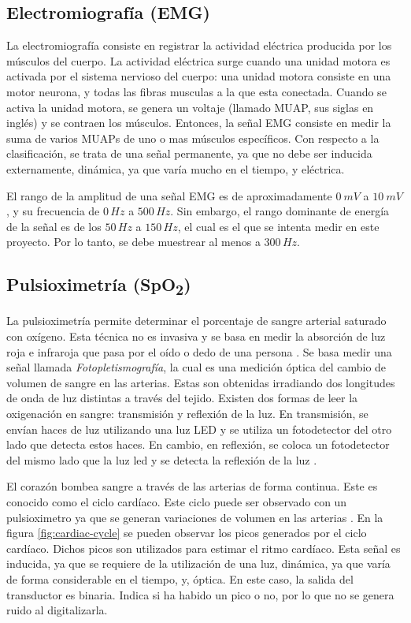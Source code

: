 \subsection{Electromiografía (EMG)}

La electromiografía consiste en registrar la actividad eléctrica producida por los músculos del cuerpo. La actividad eléctrica surge cuando una unidad motora es activada por el sistema nervioso del cuerpo: una unidad motora consiste en una motor neurona, y todas las fibras musculas a la que esta conectada.  Cuando se activa la unidad motora, se genera un voltaje (llamado MUAP, sus siglas en inglés) y se contraen los músculos.  Entonces, la señal EMG consiste en medir la suma de varios MUAPs de uno o mas músculos específicos. Con respecto a la clasificación, se trata de una señal permanente, ya que no debe ser inducida externamente, dinámica, ya que varía mucho en el tiempo, y eléctrica.

El rango de la amplitud de una señal EMG es de aproximadamente $0\ mV$ a $10\ mV$, y su frecuencia de $0\, Hz$ a $500\, Hz$.  Sin embargo, el rango dominante de energía de la señal es de los $50\, Hz$ a $150\, Hz$, el cual es el que se intenta medir en este proyecto. Por lo tanto, se debe muestrear al menos a $300 \, Hz$.

\subsection{Pulsioximetría (SpO\textsubscript{2})}

La pulsioximetría permite determinar el porcentaje de sangre arterial saturado con oxígeno. Esta técnica no es invasiva y se basa en medir la absorción de luz roja e infraroja que pasa por el oído o dedo de una persona \cite{SpO2-1}. Se basa medir una señal llamada \emph{Fotopletismografía}, la cual es una medición óptica del cambio de volumen de sangre en las arterias. Estas son obtenidas irradiando dos longitudes de onda de luz distintas a través del tejido. Existen dos formas de leer la oxigenación en sangre: transmisión y reflexión de la luz. En transmisión, se envían haces de luz utilizando una luz LED y se utiliza un fotodetector del otro lado que detecta estos haces. En cambio, en reflexión, se coloca un fotodetector del mismo lado que la luz led y se detecta la reflexión de la luz \cite{SpO2-2}.  

El corazón bombea sangre a través de las arterias de forma continua. Este es conocido como el ciclo cardíaco. Este ciclo puede ser observado con un pulsioximetro ya que se generan variaciones de volumen en las arterias \cite{SpO2-2}. En la figura \ref{fig:cardiac-cycle} se pueden observar los picos generados por el ciclo cardíaco. Dichos picos son utilizados para estimar el ritmo cardíaco. Esta señal es inducida, ya que se requiere de la utilización de una luz, dinámica, ya que varía de forma considerable en el tiempo, y, óptica. En este caso, la salida del transductor es binaria. Indica si ha habido un pico o no, por lo que no se genera ruido al digitalizarla.


